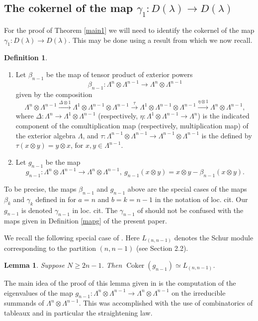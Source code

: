 \documentclass[11pt]{amsart}
\newtheorem{lem}[thm]{Lemma}
\theoremstyle{definition}
\newtheorem{defn}[thm]{Definition}
\numberwithin{equation}{section}
\DeclareMathOperator{\coker}{Coker}
\begin{document}
\subsection{The cokernel of the map $\gamma_1: D(\lambda) \to D(\lambda)$}
For the proof of Theorem \ref{main1} we will need to identify the cokernel of the map $\gamma_1: D(\lambda) \to D(\lambda)$. This may be done using a result from \cite{MMS} which we now recall.

\begin{defn}\cite[Definition 5.1]{MMS} \begin{enumerate}\item Let $\beta_{n-1}$ be the map of tensor product of exterior powers \[\beta_{n-1}: \Lambda^n \otimes \Lambda^{n-1} \to \Lambda^n \otimes \Lambda^{n-1}\] given by the composition
\[  \Lambda^n \otimes \Lambda^{n-1} \xrightarrow {\Delta \otimes 1} \Lambda^1 \otimes \Lambda^{n-1} \otimes \Lambda^{n-1} \xrightarrow{\tau}  \Lambda^1 \otimes \Lambda^{n-1} \otimes \Lambda^{n-1} \xrightarrow{\eta \otimes 1}  \Lambda^{n} \otimes \Lambda^{n-1}, \] 
where $\Delta: \Lambda^{n} \to \Lambda^1 \otimes \Lambda^{n-1}$ (respectively, $\eta: \Lambda^{1} \otimes \Lambda^{n-1} \to \Lambda^{n}$) is the indicated component of the comultiplication map (respectively, multiplication map) of the exterior algebra $\Lambda$, and $\tau: \Lambda^{n-1} \otimes  \Lambda^{n-1} \to \Lambda^{n-1} \otimes  \Lambda^{n-1}$ is the defined by $\tau(x \otimes y) =y \otimes x$, for $x, y \in \Lambda^{n-1} $. \item Let $g_{n-1}$ be the map \[g_{n-1}: \Lambda^n \otimes \Lambda^{n-1} \to \Lambda^n \otimes \Lambda^{n-1}, \ g_{n-1}(x\otimes y) =x \otimes y - \beta_{n-1}(x \otimes y). \] \end{enumerate}\end{defn}
To be precise, the maps $\beta_{n-1}$ and $g_{n-1}$ above are the special cases of the maps $\beta_k$ and $\gamma_k$ defined in \cite[Definition 5.1]{MMS} for $a=n$ and $ b=k=n-1$ in the notation of loc. cit. Our $g_{n-1}$ is denoted  $\gamma_{n-1}$ in loc. cit. The $\gamma_{n-1}$ of \cite{MMS} should not be confused with the maps given in Definition \ref{mapg} of the present paper.

We recall the following special case of \cite[Corollary 5.4]{MMS}. Here $L_{(n,n-1)}$ denotes the Schur module corresponding to the partition $(n, n-1)$ (see Section 2.2).
\begin{lem}\label{cokg} Suppose $N \ge 2n-1$. Then $\coker(g_{n-1}) \simeq L_{(n,n-1)}$.
\end{lem}
The main idea of the proof of this lemma given in \cite{MMS} is the computation of the eigenvalues of the map $g_{n-1}: \Lambda^n \otimes \Lambda^{n-1} \to \Lambda^n \otimes \Lambda^{n-1}$ on the irreducible summands of $\Lambda^n \otimes \Lambda^{n-1}$. This was accomplished with the use of combinatorics of tableaux and in particular the straightening law.
\end{document}
